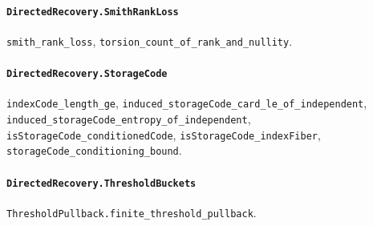 \paragraph{\texttt{DirectedRecovery.SmithRankLoss}}
{\small\raggedright \texttt{smith\_rank\_loss}, \texttt{torsion\_count\_of\_rank\_and\_nullity}.\par}

\paragraph{\texttt{DirectedRecovery.StorageCode}}
{\small\raggedright \texttt{indexCode\_length\_ge}, \texttt{induced\_storageCode\_card\_le\_of\_independent}, \texttt{induced\_storageCode\_entropy\_of\_independent}, \texttt{isStorageCode\_conditionedCode}, \texttt{isStorageCode\_indexFiber}, \texttt{storageCode\_conditioning\_bound}.\par}

\paragraph{\texttt{DirectedRecovery.ThresholdBuckets}}
{\small\raggedright \texttt{ThresholdPullback.finite\_threshold\_pullback}.\par}
